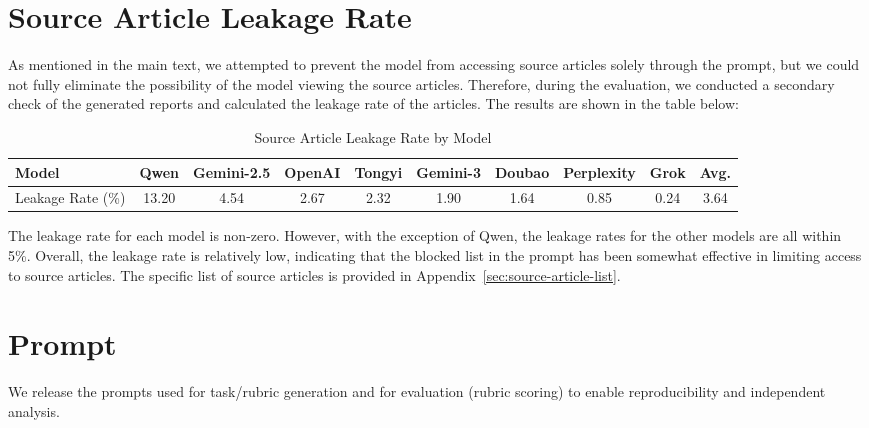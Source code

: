 \documentclass[11pt]{article}
\begin{document}
\section{Source Article Leakage Rate}
\label{sec:source-leakage}
As mentioned in the main text, we attempted to prevent the model from accessing source articles solely through the prompt, but we could not fully eliminate the possibility of the model viewing the source articles. Therefore, during the evaluation, we conducted a secondary check of the generated reports and calculated the leakage rate of the articles. The results are shown in the table below:

\begin{table}[ht]
\centering
\small
\begin{tabular}{lccccccccc}
\toprule
\textbf{Model} & \textbf{Qwen} & \textbf{Gemini-2.5} & \textbf{OpenAI} & \textbf{Tongyi} & \textbf{Gemini-3} & \textbf{Doubao} & \textbf{Perplexity} & \textbf{Grok} & \textbf{Avg.} \\
\midrule
Leakage Rate (\%) & 13.20 & 4.54 & 2.67 & 2.32 & 1.90 & 1.64 & 0.85 & 0.24 & 3.64 \\
\bottomrule
\end{tabular}
\caption{Source Article Leakage Rate by Model}
\label{tab:leakage_rate}
\end{table}

The leakage rate for each model is non-zero. However, with the exception of Qwen, the leakage rates for the other models are all within 5\%. Overall, the leakage rate is relatively low, indicating that the blocked list in the prompt has been somewhat effective in limiting access to source articles. The specific list of source articles is provided in Appendix~\ref{sec:source-article-list}.

\section{Prompt}
We release the prompts used for task/rubric generation and for evaluation (rubric scoring) to enable reproducibility and independent analysis.
\end{document}
